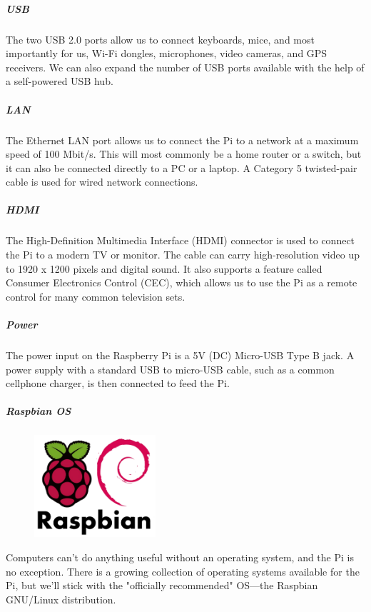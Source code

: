 \subparagraph*{USB}
\hfill \break
The two USB 2.0 ports allow us to connect keyboards, mice, and most importantly
for us, Wi-Fi dongles, microphones, video cameras, and GPS receivers. We can also
expand the number of USB ports available with the help of a self-powered USB hub.

\subparagraph*{LAN}
\hfill \break
The Ethernet LAN port allows us to connect the Pi to a network at a maximum speed
of 100 Mbit/s. This will most commonly be a home router or a switch, but it can also
be connected directly to a PC or a laptop. A Category 5 twisted-pair cable is used for
wired network connections.

\subparagraph*{HDMI}
\hfill \break
The High-Definition Multimedia Interface (HDMI) connector is used to connect the
Pi to a modern TV or monitor. The cable can carry high-resolution video up to 1920 x
1200 pixels and digital sound. It also supports a feature called Consumer Electronics
Control (CEC), which allows us to use the Pi as a remote control for many common
television sets.

\subparagraph*{Power}
\hfill \break
The power input on the Raspberry Pi is a 5V (DC) Micro-USB Type B jack. A power
supply with a standard USB to micro-USB cable, such as a common cellphone
charger, is then connected to feed the Pi.

\subparagraph*{Raspbian OS}

\begin{figure}
\vspace{-25pt}
  \begin{center}
    \includegraphics[width=0.4\textwidth]{./Pictures/raspbian.png}
  \end{center}
\end{figure}
\hfill \break
Computers can't do anything useful without an operating system, and the Pi is
no exception. There is a growing collection of operating systems available for
the Pi, but we'll stick with the "officially recommended" OS—the Raspbian
GNU/Linux distribution.
\clearpage


